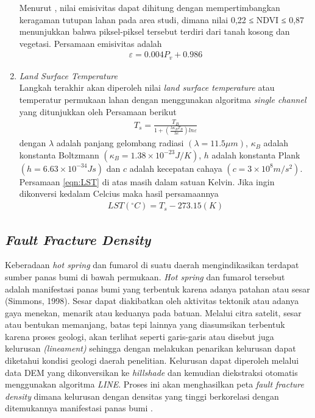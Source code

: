\begin{enumerate}
	Menurut \citep{SobrinoandJimenezMunoz}, nilai emisivitas dapat dihitung dengan mempertimbangkan keragaman tutupan lahan pada area studi, dimana nilai 0,22 ≤ NDVI ≤ 0,87 menunjukkan bahwa piksel-piksel tersebut terdiri dari tanah kosong dan vegetasi. Persamaan emisivitas adalah
	\begin{align}
		\varepsilon = 0.004P_v +0.986
	\end{align}
	\vskip 5pt
	\item \textit{Land Surface Temperature}\\
	Langkah terakhir akan diperoleh nilai \textit{land surface temperature} atau temperatur permukaan lahan dengan menggunakan algoritma \textit{single channel} yang ditunjukkan oleh Persamaan berikut \citep{AvdanandJovanovska}
	\begin{align}
		T_s = \frac{T_B}{1+\left ( \frac{\lambda \kappa_B T_B}{hc} \right )ln\varepsilon}\label{eqn:LST}
	\end{align}
	dengan $\lambda$ adalah panjang gelombang radiasi $(\lambda = 11.5\mu m)$, $\kappa_B$ adalah konstanta Boltzmann $(\kappa_B = 1.38\times 10^{-23}J/K)$, $h$ adalah konstanta Plank $(h = 6.63\times 10^{-34}Js)$ dan $c$ adalah kecepatan cahaya $(c=3\times 10^{8}m/s^2)$. Persamaan \ref{eqn:LST} di atas masih dalam satuan Kelvin. Jika ingin dikonversi kedalam Celcius maka hasil persamaannya
	\begin{align}
		LST(^{\circ}C) = T_s - 273.15(K)
	\end{align}
\end{enumerate}
\subsection{\textit{Fault Fracture Density}}
\hspace{25pt} Keberadaan \textit{hot spring} dan fumarol di suatu daerah mengindikasikan terdapat sumber panas bumi di bawah permukaan. \textit{Hot spring }dan fumarol tersebut adalah manifestasi panas bumi yang terbentuk karena adanya patahan atau sesar (Simmons, 1998).  Sesar dapat diakibatkan oleh aktivitas tektonik atau adanya gaya menekan, menarik atau keduanya pada batuan. Melalui citra satelit, sesar atau bentukan memanjang, batas tepi lainnya yang diasumsikan terbentuk karena proses geologi, akan terlihat seperti garis-garis atau disebut juga kelurusan \textit{(lineament)} sehingga dengan melakukan penarikan kelurusan dapat diketahui kondisi geologi daerah penelitian. Kelurusan dapat diperoleh melalui data DEM yang dikonversikan ke \textit{hillshade }dan kemudian diekstraksi otomatis menggunakan algoritma \textit{LINE}. Proses ini akan menghasilkan peta \textit{fault fracture density} dimana kelurusan dengan densitas yang tinggi berkorelasi dengan ditemukannya manifestasi panas bumi \citep{Noviar}.
